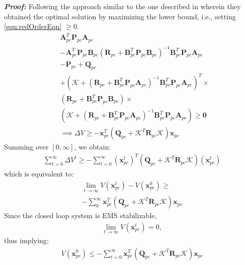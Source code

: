 \documentclass[letterpaper, 10 pt, conference]{ieeeconf}  %
\newcommand{\vo}[1]{\boldsymbol{#1}}
\begin{document}
\textit{\textbf{Proof:}}
Following the approach similar to the one described in \cite{bhattacharya2019robust} wherein they obtained the optimal solution by maximizing the lower bound, i.e., setting \eqref{eqn:redOrderEqn} $\geq 0$.
\begin{align}
	&\vo{A}_{pc}^T \vo{P}_{pc} \vo{A}_{pc} \nonumber\\
   & - \vo{A}_{pc}^T \vo{P}_{pc} \vo{B}_{pc} (\vo{R}_{pc} + \vo{B}_{pc}^T \vo{P}_{pc} \vo{B}_{pc})^{-1} \vo{B}_{pc}^T \vo{P}_{pc} \vo{A}_{pc} \nonumber\\
   & - \vo{P}_{pc} + \vo{Q}_{pc} \nonumber\\
	& + (\vo{\mathcal{K}} + (\vo{R}_{pc} + \vo{B}_{pc}^T \vo{P}_{pc} \vo{A}_{pc})^{-1} \vo{B}_{pc}^T \vo{P}_{pc} \vo{A}_{pc})^T \times \nonumber\\
   &(\vo{R}_{pc} + \vo{B}_{pc}^T \vo{P}_{pc} \vo{B}_{pc} ) \times \nonumber \\
   &(\vo{\mathcal{K}} + (\vo{R}_{pc} + \vo{B}_{pc}^T \vo{P}_{pc} \vo{A}_{pc})^{-1} \vo{B}_{pc}^T \vo{P}_{pc} \vo{A}_{pc}) \geq \vo{0} \label{eqn:maxLB}\\
	&\implies \Delta V \geq -\vo{x}_{pc}^T (\vo{Q}_{pc} + \vo{\mathcal{K}}^T \vo{R}_{pc} \vo{\mathcal{K}}) \vo{x}_{pc} \nonumber
\end{align}
Summing over $[0, \infty]$, we obtain:
\begin{align}
   \sum_{t=0}^{\infty} \Delta V^t \geq  -  \sum_{t=0}^{\infty} (\vo{x}_{pc}^t)^T (\vo{Q}_{pc} + \vo{\mathcal{K}}^T \vo{R}_{pc} \vo{\mathcal{K}})(\vo{x}_{pc}^t)
\end{align}
which is equivalent to:
\begin{align}
   \lim_{t \to \infty}V(\vo{x}_{pc}^t) - V(\vo{x}_{pc}^0) \geq \nonumber\\
	  - \sum_0^{\infty} \vo{x}_{pc}^T (\vo{Q}_{pc} + \vo{\mathcal{K}}^T \vo{R}_{pc} \vo{\mathcal{K}}) \vo{x}_{pc}
\end{align}
Since the closed loop system is EMS stabilizable,
\begin{align}
   \lim_{t \to \infty}V(\vo{x}_{pc}^t) = 0,
\end{align}
thus implying:
\begin{align}
   V(\vo{x}_{pc}^0) \leq  -  \sum_{t=0}^{\infty} \vo{x}_{pc}^T (\vo{Q}_{pc} + \vo{\mathcal{K}}^T \vo{R}_{pc} \vo{\mathcal{K}}) \vo{x}_{pc}
\end{align}
\end{document}
